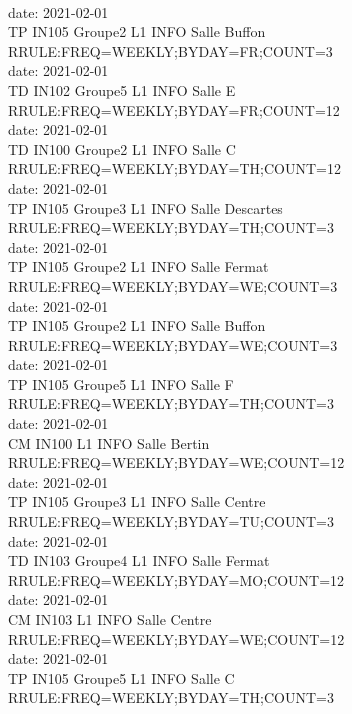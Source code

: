 \documentclass{ltxdoc}
\begin{document}
\begin{center}
\\ date: 2021-02-01\\TP  IN105  Groupe2  L1 INFO  Salle Buffon\\RRULE:FREQ=WEEKLY;BYDAY=FR;COUNT=3
\\ date: 2021-02-01\\TD  IN102  Groupe5  L1 INFO  Salle E\\RRULE:FREQ=WEEKLY;BYDAY=FR;COUNT=12
\\ date: 2021-02-01\\TD  IN100  Groupe2  L1 INFO  Salle C\\RRULE:FREQ=WEEKLY;BYDAY=TH;COUNT=12
\\ date: 2021-02-01\\TP  IN105  Groupe3  L1 INFO  Salle Descartes\\RRULE:FREQ=WEEKLY;BYDAY=TH;COUNT=3
\\ date: 2021-02-01\\TP  IN105  Groupe2  L1 INFO  Salle Fermat\\RRULE:FREQ=WEEKLY;BYDAY=WE;COUNT=3
\\ date: 2021-02-01\\TP  IN105  Groupe2  L1 INFO  Salle Buffon\\RRULE:FREQ=WEEKLY;BYDAY=WE;COUNT=3
\\ date: 2021-02-01\\TP  IN105  Groupe5  L1 INFO  Salle F\\RRULE:FREQ=WEEKLY;BYDAY=TH;COUNT=3
\\ date: 2021-02-01\\CM  IN100    L1 INFO  Salle Bertin\\RRULE:FREQ=WEEKLY;BYDAY=WE;COUNT=12
\\ date: 2021-02-01\\TP  IN105  Groupe3  L1 INFO  Salle Centre\\RRULE:FREQ=WEEKLY;BYDAY=TU;COUNT=3
\\ date: 2021-02-01\\TD  IN103  Groupe4  L1 INFO  Salle Fermat\\RRULE:FREQ=WEEKLY;BYDAY=MO;COUNT=12
\\ date: 2021-02-01\\CM  IN103    L1 INFO  Salle Centre\\RRULE:FREQ=WEEKLY;BYDAY=WE;COUNT=12
\\ date: 2021-02-01\\TP  IN105  Groupe5  L1 INFO  Salle C\\RRULE:FREQ=WEEKLY;BYDAY=TH;COUNT=3

\end{center}
\end{document}
